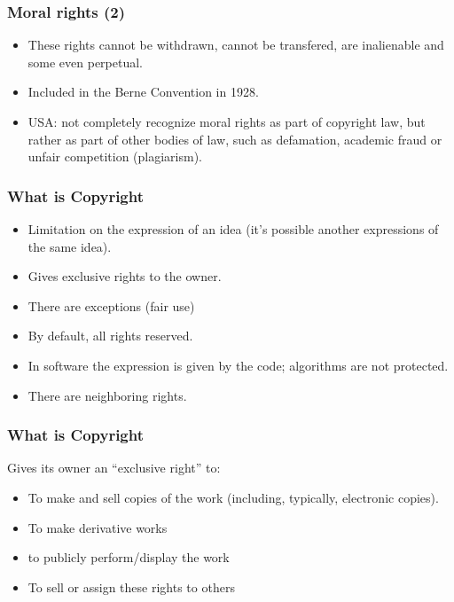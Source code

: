 
\begin{frame}
\frametitle{Moral rights (2)}

\begin{itemize}
\item These rights cannot be withdrawn, cannot be transfered, are inalienable
and some even perpetual.
\item Included in the Berne Convention in 1928. 
\item USA: not completely recognize moral rights as part of copyright law, but rather as part of other bodies of law, such as defamation, academic fraud or unfair competition (plagiarism).
\end{itemize}


\end{frame}





\begin{frame}
\frametitle{What is Copyright}

\begin{itemize}
\item Limitation on the \alert{expression} of an idea (it's possible another expressions of the same idea).
\item Gives exclusive rights to the owner.
\item There are exceptions (fair use)
\item By default, all rights reserved.
\item In software the expression is given by the code; algorithms are
not protected.
\item There are neighboring rights.
\end{itemize}

\end{frame}



\begin{frame}
\frametitle{What is Copyright}

Gives its owner an ``exclusive right'' to:

\begin{itemize}
\item To make and sell copies of the work (including,
typically, electronic copies).
\item To make derivative works
\item to publicly perform/display the work
\item To sell or assign these rights to others
\end{itemize}

\end{frame}


